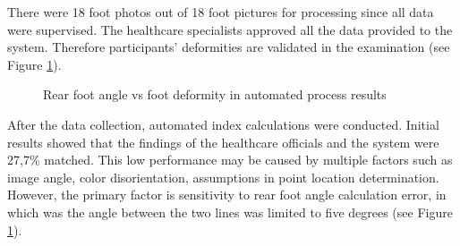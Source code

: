 There were 18 foot photos out of 18 foot pictures for processing since all data were supervised. The healthcare specialists approved all the data provided to the system. Therefore participants' deformities are validated in the examination (see Figure  \ref{fig:StudyIIFootDeformityAutomatedDegreesAndDeformityResults}).

\begin{figure}[htbp]
\centering
{}
\caption{Rear foot angle vs foot deformity in automated process results}
\label{fig:StudyIIFootDeformityAutomatedDegreesAndDeformityResults}
\end{figure} 

After the data collection, automated index calculations were conducted. Initial results showed that the findings of the healthcare officials and the system were 27,7\% matched. This low performance may be caused by multiple factors such as image angle, color disorientation, assumptions in point location determination. However, the primary factor is sensitivity to rear foot angle calculation error, in which was the angle between the two lines was limited to five degrees (see Figure \ref{fig:StudyIIFootDeformityAutomatedDegreesAndDeformityResults}). 
